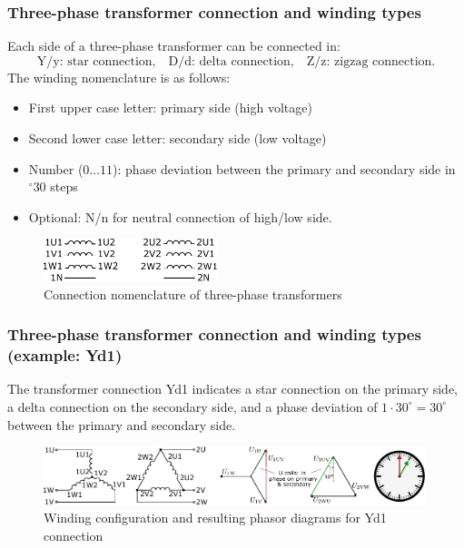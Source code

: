 \begin{frame}
	\frametitle{Three-phase transformer connection and winding types}
		Each side of a three-phase transformer can be connected in:
		\begin{equation*}
			\mbox{Y/y: star connection,}\quad \mbox{D/d: delta connection,}\quad \mbox{Z/z: zigzag connection.}
		\end{equation*}
		The winding nomenclature is as follows:
		\begin{itemize}
			\item First upper case letter: primary side (high voltage)
			\item Second lower case letter: secondary side (low voltage)
			\item Number ($0\ldots 11$): phase deviation between the primary and secondary side in $^\circ 30$ steps
			\item Optional: N/n for neutral connection of  high/low side.
		\end{itemize}

		\begin{figure}
			\includegraphics[width=0.45\textwidth]{fig/lec04/Connection_nomenclature_three_phase_transformer.pdf}
			\caption{Connection nomenclature of three-phase transformers}
			\label{fig:Connection_nomenclature_three_phase_transformer}
		\end{figure}
\end{frame}

\begin{frame}
	\frametitle{Three-phase transformer connection and winding types (example: Yd1)}
	The transformer connection Yd1 indicates a star connection on the primary side, a delta connection on the secondary side, and a phase deviation of $1\cdot30^\circ=30^\circ$ between the primary and secondary side.	
	\vspace{2em}
	\begin{figure}
		\includegraphics[width=0.99\textwidth]{fig/lec04/Yd1_example.pdf}
		\caption{Winding configuration and resulting phasor diagrams for Yd1 connection}
		\label{fig:Yd1_example}
	\end{figure}
\end{frame}

